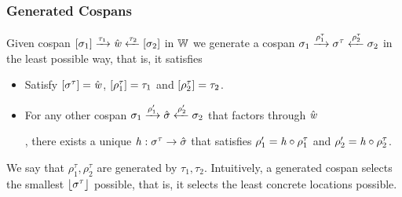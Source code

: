 \subsubsection{Generated Cospans}

\begin{lemma}\label{lem:gen-cospan}
    Given cospan $[\sigma_1] \xrightarrow{\tau_1} \hat{\mathit{w}} \xleftarrow{\tau_2} [\sigma_2]$ in $\mathbb{W}$ 
    we generate a cospan $\sigma_1 \xrightarrow{\rho^\tau_1} \sigma^\tau \xleftarrow{\rho^\tau_2} \sigma_2$ in the least possible way, 
    that is, it satisfies
    \begin{itemize}
        \item Satisfy $[\sigma^\tau] = \hat{\mathit{w}}$, $[\rho^\tau_1] = \tau_1$ and $[\rho^\tau_2] = \tau_2$.
        \item For any other cospan $\sigma_1 \xrightarrow{\rho_1'} \hat\sigma \xleftarrow{\rho_2'} \sigma_2$ that factors through $\hat{\mathit{w}}$
                ,
              there exists a unique $\mathit{h} : \sigma^\tau \to \hat\sigma$ that satisfies $\rho_1' = \mathit{h} \circ \rho^\tau_1$ and $\rho_2' = \mathit{h} \circ \rho^\tau_2$.
    \end{itemize}

    We say that $\rho^\tau_1, \rho^\tau_2$ are generated by $\tau_1, \tau_2$.
    Intuitively, a generated cospan selects the smallest $\lfloor\sigma^\tau\rfloor$ possible, that is, it selects the least concrete locations possible.
\end{lemma}
